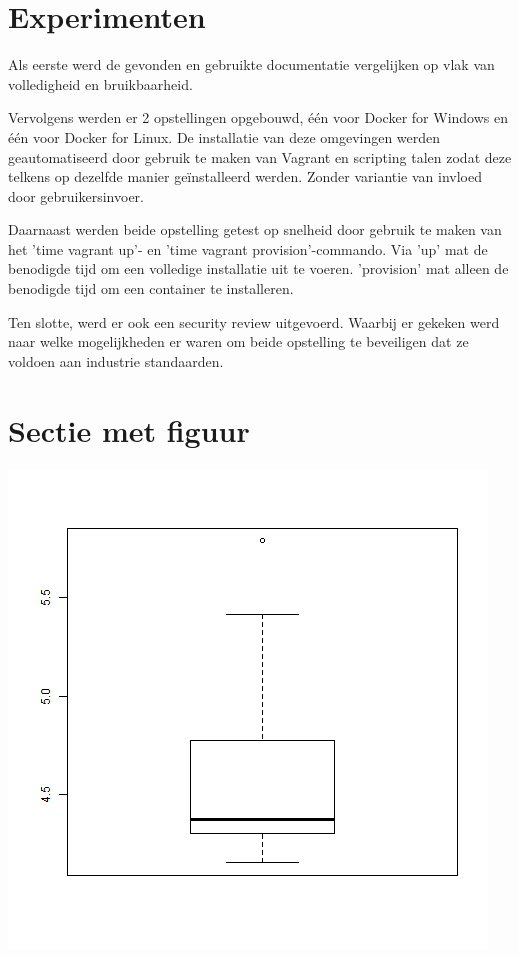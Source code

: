 \documentclass[a0,portrait]{a0poster}
\begin{document}
\begin{multicols}{2}
\color{Black} %
\color{HoGentAccent1} 
\section*{Experimenten}
\color{black}

Als eerste werd de gevonden en gebruikte documentatie vergelijken op vlak van volledigheid en bruikbaarheid.

Vervolgens werden er 2 opstellingen opgebouwd, één voor Docker for Windows en één voor Docker for Linux. De installatie van deze omgevingen werden geautomatiseerd door gebruik te maken van Vagrant en scripting talen zodat deze telkens op dezelfde manier geïnstalleerd werden. Zonder variantie van invloed door gebruikersinvoer.

Daarnaast werden beide opstelling getest op snelheid door gebruik te maken van het 'time vagrant up'- en 'time vagrant provision'-commando. Via 'up' mat de benodigde tijd om een volledige installatie uit te voeren. 'provision' mat alleen de benodigde tijd om een container te installeren.

Ten slotte, werd er ook een security review uitgevoerd. Waarbij er gekeken werd naar welke mogelijkheden er waren om beide opstelling te beveiligen dat ze voldoen aan industrie standaarden.

\color{HoGentAccent1} 
\section*{Sectie met figuur}
\color{black}

\begin{center}\vspace{1cm}
	\includegraphics[width=0.4\linewidth]{centosfullboxplot}
\end{center}\vspace{1cm}


\end{multicols}
\end{document}
